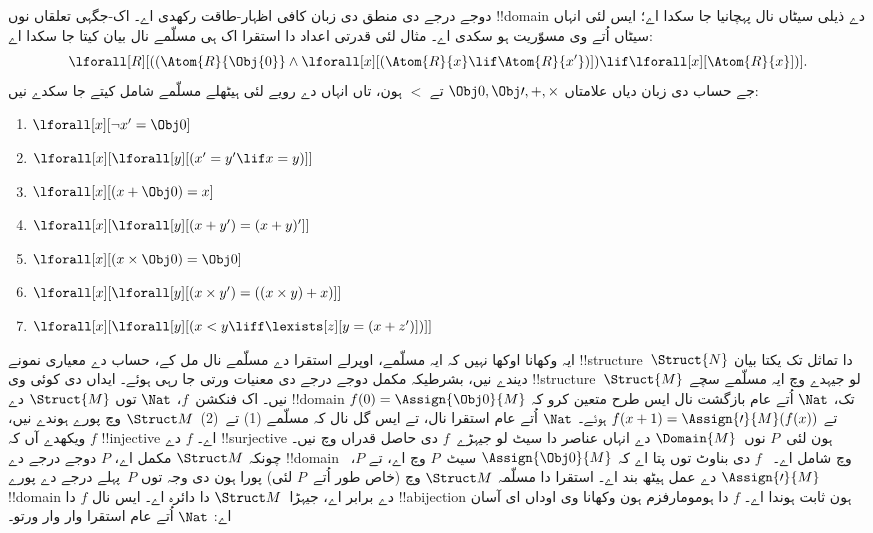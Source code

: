 \documentclass[../../../include/open-logic-section]{subfiles}
\begin{document}
دوجے درجے دی منطق دی زبان کافی
اظہار-طاقت رکھدی اے۔ اک-جگہی تعلقاں
نوں !!{domain} دے ذیلی سیٹاں نال
پہچانیا جا سکدا اے؛ ایس لئی انہاں
سیٹاں اُتے وی مسوّریت ہو سکدی اے۔
مثال لئی قدرتی اعداد دا استقرا اک
ہی مسلّمے نال بیان کیتا جا سکدا اے:
\[
\lforall[R][((\Atom{R}{\Obj{0}} \land \lforall[x][(\Atom{R}{x} \lif
    \Atom{R}{x'})]) \lif \lforall[x][\Atom{R}{x}])].
\]
جے حساب دی زبان دیاں علامتاں
$\Obj 0, \Obj \prime, +,
\times$ تے $<$ ہون، تاں انہاں دے
رویے لئی ہیٹھلے مسلّمے شامل
کیتے جا سکدے نیں:
\begin{enumerate}
\item $\lforall[x][\lnot x' = \Obj 0]$
\item $\lforall[x][\lforall[y][(x' = y' \lif x = y)]]$
\item $\lforall[x][(x + \Obj 0) = x]$
\item $\lforall[x][\lforall[y][(x + y') = (x + y)']]$
\item $\lforall[x][(x \times \Obj 0) = \Obj 0]$
\item $\lforall[x][\lforall[y][(x \times y') = ((x \times y) + x)]]$
\item $\lforall[x][\lforall[y][(x < y \liff \lexists[z][y = (x + z')])]]$
\end{enumerate}
ایہ وکھانا اوکھا نہیں کہ ایہ مسلّمے،
اوپرلے استقرا دے مسلّمے نال مل کے،
حساب دے معیاری نمونے
!!{structure}~$\Struct{N}$ دا
تماثل تک یکتا بیان دیندے نیں،
بشرطیکہ مکمل دوجے درجے دی معنیات
ورتی جا رہی ہوئے۔ ایداں دی کوئی وی
!!{structure}~$\Struct{M}$ لو جیہدے
وچ ایہ مسلّمے سچے نیں۔ اک
فنکشن~$f$، $\Nat$ توں
$\Struct{M}$ دے !!{domain} تک،
$\Nat$ اُتے عام بازگشت نال
ایس طرح متعین کرو کہ
$f(0) = \Assign{\Obj 0}{M}$ تے
$f(x+1) = \Assign{\prime}{M}(f(x))$
ہوئے۔ $\Nat$ اُتے عام استقرا نال،
تے ایس گل نال کہ مسلّمے (1)
تے~(2)~$\Struct M$ وچ پورے ہوندے
نیں، ویکھدے آں کہ $f$ !!{injective}
اے۔ $f$ دے !!{surjective} ہون
لئی~$P$ نوں~$\Domain{M}$ دے انہاں
عناصر دا سیٹ لو جیہڑے~$f$ دی
حاصل قدراں وچ نیں۔ چونکہ
$\Struct M$ مکمل اے، $P$ دوجے درجے
دے !!{domain} وچ شامل اے۔
~$f$ دی بناوٹ توں پتا اے کہ
$\Assign{\Obj
  0}{M}$ سیٹ~$P$ وچ اے، تے
$P$،~$\Assign{\prime}{M}$ دے
عمل ہیٹھ بند اے۔ استقرا دا مسلّمہ
$\Struct M$ وچ (خاص طور اُتے~$P$
لئی) پورا ہون دی وجہ توں
$P$~پہلے درجے دے پورے !!{domain}
دے برابر اے، جیہڑا~$\Struct M$ دا
دائرہ اے۔ ایس نال $f$ دا
!!a{bijection} ہون ثابت ہوندا اے۔
$f$ دا ہومومارفزم ہون وکھانا وی
اوداں ای آسان اے: $\Nat$ اُتے
عام استقرا وار وار ورتو۔
\end{document}

